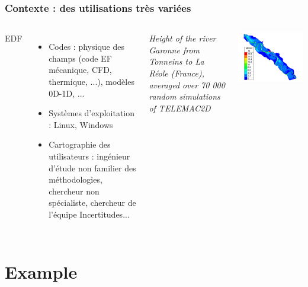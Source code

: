 \documentclass{beamer}
\begin{document}
\begin{frame}[containsverbatim]
\frametitle{Contexte : des utilisations très variées}

  \begin{columns}
EDF
\begin{itemize}
\item Codes : physique des champs (code EF mécanique, CFD, thermique, ...), modèles 0D-1D, ...
\item Systèmes d'exploitation : Linux, Windows
\item Cartographie des utilisateurs : ingénieur d'étude non familier des méthodologies, chercheur non spécialiste, chercheur de l'équipe Incertitudes... 
\end{itemize}

\emph{Height of the river Garonne from Tonneins to La Réole (France), averaged over
70 000 random simulations of TELEMAC2D}
\begin{center}
\includegraphics[width=\textwidth]{figures/Garonne-Height-Mean}
\end{center}

  \end{columns}

\end{frame}


\section{Example}
\end{document}
